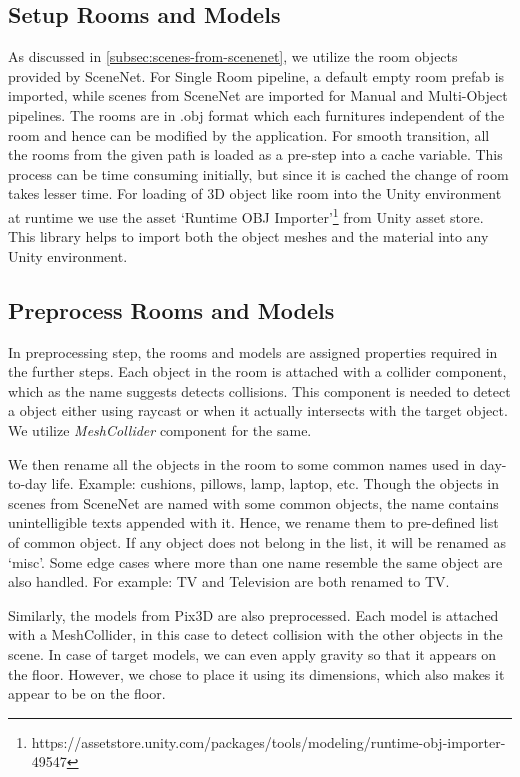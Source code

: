 \subsection{Setup Rooms and Models}\label{subsec:implementation_setup_rooms_models}
As discussed in \autoref{subsec:scenes-from-scenenet}, we utilize the room objects provided by SceneNet.
For Single Room pipeline, a default empty room prefab is imported, while scenes from SceneNet are imported for Manual and Multi-Object pipelines.
The rooms are in .obj format which each furnitures independent of the room and hence can be modified by the application.
For smooth transition, all the rooms from the given path is loaded as a pre-step into a cache variable.
This process can be time consuming initially, but since it is cached the change of room takes lesser time.
For loading of 3D object like room into the Unity environment at runtime we use the asset `Runtime OBJ Importer'\footnote{https://assetstore.unity.com/packages/tools/modeling/runtime-obj-importer-49547} from Unity asset store.
This library helps to import both the object meshes and the material into any Unity environment.

\subsection{Preprocess Rooms and Models}\label{subsec:implementation_preprocess_rooms_models}
In preprocessing step, the rooms and models are assigned properties required in the further steps.
Each object in the room is attached with a collider component, which as the name suggests detects collisions.
This component is needed to detect a object either using raycast or when it actually intersects with the target object.
We utilize \emph{MeshCollider} component for the same.

We then rename all the objects in the room to some common names used in day-to-day life.
Example: cushions, pillows, lamp, laptop, etc.
Though the objects in scenes from SceneNet are named with some common objects, the name contains unintelligible texts appended with it.
Hence, we rename them to pre-defined list of common object.
If any object does not belong in the list, it will be renamed as `misc'.
Some edge cases where more than one name resemble the same object are also handled.
For example: TV and Television are both renamed to TV.

Similarly, the models from Pix3D are also preprocessed.
Each model is attached with a MeshCollider, in this case to detect collision with the other objects in the scene.
In case of target models, we can even apply gravity so that it appears on the floor.
However, we chose to place it using its dimensions, which also makes it appear to be on the floor.


